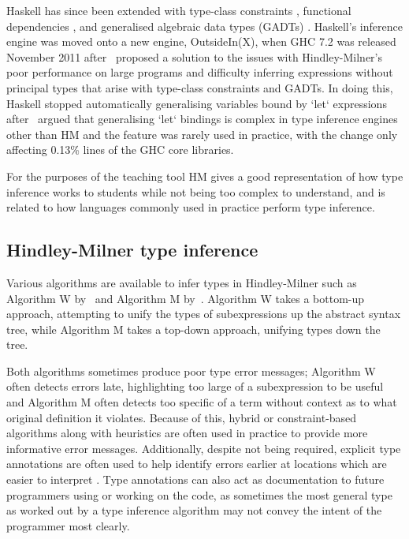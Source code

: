 \documentclass[a4paper,fleqn,12pt]{article}
\begin{document}
Haskell has since been extended with type-class constraints \citep{ref16}, functional dependencies \citep{ref17}, and generalised algebraic data types (GADTs) \citep{ref18}. Haskell’s inference engine was moved onto a new engine, OutsideIn(X), when GHC 7.2 was released November 2011 after~\cite{ref19} proposed a solution to the issues with Hindley-Milner’s poor performance on large programs and difficulty inferring expressions without principal types that arise with type-class constraints and GADTs. In doing this, Haskell stopped automatically generalising variables bound by `let` expressions after~\cite{ref20} argued that generalising `let` bindings is complex in type inference engines other than HM and the feature was rarely used in practice, with the change only affecting 0.13\% lines of the GHC core libraries.

For the purposes of the teaching tool HM gives a good representation of how type inference works to students while not being too complex to understand, and is related to how languages commonly used in practice perform type inference.

\subsection{Hindley-Milner type inference}\label{id:h.admfqf7bhkct}

Various algorithms are available to infer types in Hindley-Milner such as Algorithm W by~\cite{ref21} and Algorithm M by~\cite{ref22}. Algorithm W takes a bottom-up approach, attempting to unify the types of subexpressions up the abstract syntax tree, while Algorithm M takes a top-down approach, unifying types down the tree.

Both algorithms sometimes produce poor type error messages; Algorithm W often detects errors late, highlighting too large of a subexpression to be useful and Algorithm M often detects too specific of a term without context as to what original definition it violates. Because of this, hybrid or constraint-based algorithms along with heuristics are often used in practice to provide more informative error messages. Additionally, despite not being required, explicit type annotations are often used to help identify errors earlier at locations which are easier to interpret \citep{ref23}. Type annotations can also act as documentation to future programmers using or working on the code, as sometimes the most general type as worked out by a type inference algorithm may not convey the intent of the programmer most clearly.
\end{document}

